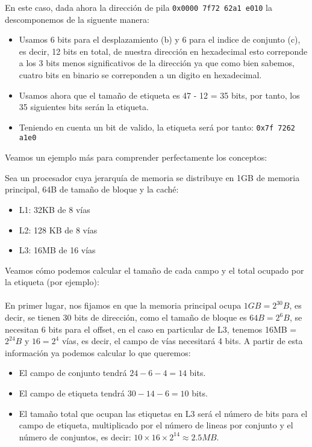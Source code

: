 En este caso, 
dada ahora la dirección de pila \texttt{0x0000 7f72 62a1 e010} la descomponemos de la siguente manera:
\begin{itemize}
    \item Usamos 6 bits para el desplazamiento (b) y 6 para el indice de conjunto (c), es decir, 12 bits en total, de nuestra dirección en hexadecimal
        esto correponde a los 3 bits menos significativos de la dirección ya que como bien sabemos, cuatro bits en binario se correponden a un digito en hexadecimal.
    \item Usamos ahora que el tamaño de etiqueta es 47 - 12 = 35 bits, por tanto, los 35 siguientes bits serán la etiqueta.
    \item Teniendo en cuenta un bit de valido, la etiqueta será por tanto: \texttt{0x7f 7262 a1e0}
\end{itemize}
Veamos un ejemplo más para comprender perfectamente los conceptos:
\begin{ejemplo}
    Sea un procesador cuya jerarquía de memoria se distribuye en 1GB de memoria principal, 64B de tamaño de bloque y la caché:
    \begin{itemize}
        \item L1: 32KB de 8 vías
        \item L2: 128 KB de 8 vías
        \item L3: 16MB de 16 vías
    \end{itemize}
    Veamos cómo podemos calcular el tamaño de cada campo y el total ocupado por la etiqueta (por ejemplo):
    \\ \\ 
    En primer lugar, nos fijamos en que la memoria principal ocupa $1GB = 2^{30}B$, es decir, se tienen 30 bits de dirección,
    como el tamaño de bloque es $64B = 2^6B$, se necesitan 6 bits para el offset, en el caso en particular de L3, tenemos 16MB = $2^{24}B$ 
    y $16 = 2^4$ vías, es decir, el campo de vías necesitará 4 bits. A partir de esta información ya podemos calcular lo que queremos:
    \begin{itemize}
        \item El campo de conjunto tendrá $24 - 6 - 4 = 14$ bits.
        \item El campo de etiqueta tendrá $30 - 14 - 6 = 10$ bits.
        \item El tamaño total que ocupan las etiquetas en L3 será el número de bits para el campo de etiqueta, multiplicado por el número 
            de lineas por conjunto y el número de conjuntos, es decir: $10 \times 16 \times 2^{14} \approx 2.5MB$.
    \end{itemize}
\end{ejemplo}

